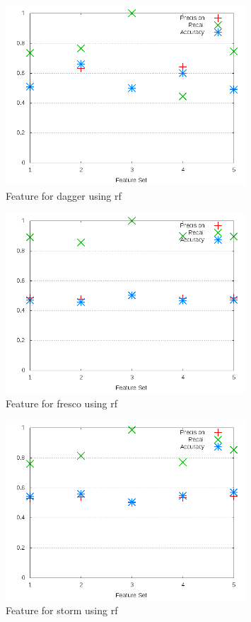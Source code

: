 \begin{figure}[h]
    \centering
        \includegraphics[width=0.8\textwidth]{images/rf/test_3/dagger_sample_range}
        \caption{Feature for dagger using \gls{rf}}
        \label{fig:test_3_dagger_rf}
\end{figure}

\begin{figure}[h]
    \centering
        \includegraphics[width=0.8\textwidth]{images/rf/test_3/fresco_sample_range}
        \caption{Feature for fresco using \gls{rf}}
        \label{fig:test_3_fresco_rf}
\end{figure}

\begin{figure}[h]
    \centering
        \includegraphics[width=0.8\textwidth]{images/rf/test_3/storm_sample_range}
        \caption{Feature for storm using \gls{rf}}
        \label{fig:test_3_storm_rf}
\end{figure}

